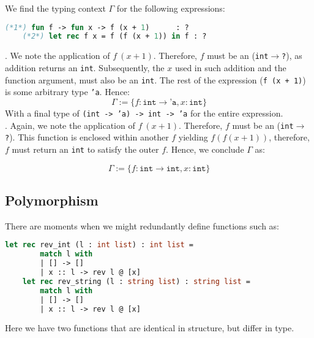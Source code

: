 \begin{Example}
    
    We find the typing context $\Gamma$ for the following expressions:
    \begin{lstlisting}[language=OCaml, numbers=none, mathescape=true]
    (*1*) fun f -> fun x -> f (x + 1)      : ?
    (*2*) let rec f x = f (f (x + 1)) in f : ?
    \end{lstlisting}
    
    . We note the application of $f\ (x + 1)$. Therefore, $f$ must be an (\texttt{int}$\to$\texttt{?}), as addition returns an \texttt{int}. Subsequently,
    the $x$ used in such addition and the function argument, must also be an \texttt{int}. The rest of the expression (\texttt{f (x + 1)}) is some arbitrary type \texttt{'a}. 
    Hence:
    $$\Gamma := \{f: \texttt{int} \to \texttt{'a}, x: \texttt{int}\}$$
    \noindent
    With a final type of \texttt{(int -> 'a) -> int -> 'a} for the entire expression.\\

    . Again, we note the application of $f\ (x + 1)$. Therefore, $f$ must be an (\texttt{int}$\to$\texttt{?}). This function is enclosed
    within another $f$ yielding $f(f(x+1))$, therefore, $f$ must return an \texttt{int} to satisfy the outer $f$. Hence, we conclude $\Gamma$ as: 

    $$\Gamma := \{f: \texttt{int} \to \texttt{int}, x: \texttt{int}\}$$

\end{Example}

\subsection{Polymorphism}

\noindent
There are moments when we might redundantly define functions such as:

\begin{lstlisting}[language=OCaml, numbers=none]
    let rec rev_int (l : int list) : int list =
        match l with
        | [] -> []
        | x :: l -> rev l @ [x]
    let rec rev_string (l : string list) : string list =
        match l with
        | [] -> []
        | x :: l -> rev l @ [x]
\end{lstlisting}

\noindent
Here we have two functions that are identical in structure, but differ in type.

